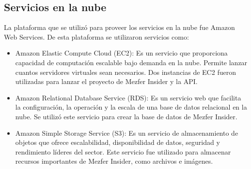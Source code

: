 \subsection{Servicios en la nube}
La plataforma que se utilizó para proveer los servicios en la nube fue Amazon Web Services. De esta plataforma se utilizaron servicios como:
\begin{itemize}
    \item Amazon Elastic Compute Cloud (EC2): Es un servicio que proporciona capacidad de computación escalable bajo demanda en la nube. Permite lanzar cuantos servidores virtuales sean necesarios. Dos instancias de EC2 fueron utilizadas para lanzar el proyecto de Mezfer Insider y la API.
    \item Amazon Relational Database Service (RDS): Es un servicio web que facilita la configuración, la operación y la escala de una base de datos relacional en la nube. Se utilizó este servicio para crear la base de datos de Mezfer Insider.
    \item Amazon Simple Storage Service (S3): Es un servicio de almacenamiento de objetos que ofrece escalabilidad, disponibilidad de datos, seguridad y rendimiento líderes del sector. Este servicio fue utilizado para almacenar recursos importantes de Mezfer Insider, como archivos e imágenes.
\end{itemize}